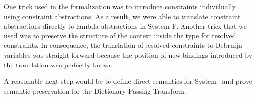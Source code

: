 \noindent One trick used in the formalization was to introduce constraints individually using constraint abstractions. As a result, we were able to translate constraint abstractions directly to lambda abstractions in System F. Another trick that we used was to preserve the structure of the context inside the type for resolved constraints. In consequence, the translation of resolved constraints to Debruijn variables was straight forward because the position of new bindings introduced by the translation was perfectly known.   

\noindent A reasonable next step would be to define direct semantics for System \Fo\ and prove semantic preservation for the Dictionary Passing Transform. 